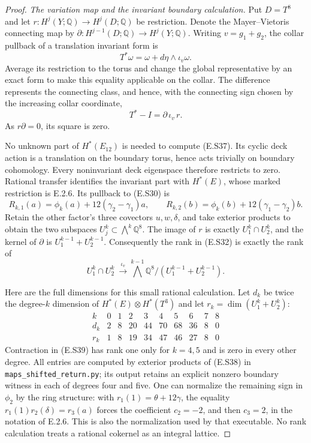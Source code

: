 \begin{proof}
\emph{The variation map and the invariant boundary calculation.}
Put $D=T^8$ and let $r:H^j(Y;\mathbb Q)\to H^j(D;\mathbb Q)$
be restriction. Denote the Mayer--Vietoris connecting map
by $\partial:H^{j-1}(D;\mathbb Q)\to H^j(Y;\mathbb Q)$.
Writing $v=g_1+g_2$, the collar pullback of a translation
invariant form is
\[
       T^*\omega=\omega+d\eta\wedge\iota_v\omega.
\]
Average its restriction to the torus and change the global
representative by an exact form to make this equality
applicable on the collar. The difference represents the
connecting class, and hence, with the connecting sign
chosen by the increasing collar coordinate,
\[
                          T^*-I=\partial\,\iota_v\,r.
 \tag{E.S37}
\]
As $r\partial=0$, its square is zero.

No unknown part of $H^*(E_{12})$ is needed to compute
(E.S37). Its cyclic deck action is a translation on the
boundary torus, hence acts trivially on boundary cohomology.
Every noninvariant deck eigenspace therefore restricts to
zero. Rational transfer identifies the invariant part
with $H^*(E)$, whose marked restriction is E.2.6. Its
pullback to (E.S30) is
\[
 R_{k,1}(a)=\phi_k(a)+12(\gamma_2-\gamma_1)a,
 \qquad
 R_{k,2}(b)=\phi_k(b)+12(\gamma_1-\gamma_2)b.
 \tag{E.S38}
\]
Retain the other factor's three covectors $u,w,\delta$,
and take exterior products to obtain the two subspaces
$U_j^k\subset\bigwedge^k\mathbb Q^8$.
The image of $r$ is exactly $U_1^k\cap U_2^k$, and the
kernel of $\partial$ is $U_1^{k-1}+U_2^{k-1}$.
Consequently the rank in (E.S32) is exactly the rank of
\[
 U_1^k\cap U_2^k\ \stackrel{\iota_v}{\longrightarrow}
 \bigwedge^{k-1}\mathbb Q^8/(U_1^{k-1}+U_2^{k-1}).
 \tag{E.S39}
\]

Here are the full dimensions for this small rational
calculation. Let $d_k$ be twice the degree-$k$ dimension
of $H^*(E)\otimes H^*(T^3)$ and let
$r_k=\dim(U_1^k+U_2^k)$:
\[
 \begin{array}{c|rrrrrrrrr}
 k&0&1&2&3&4&5&6&7&8\\ \hline
 d_k&2&8&20&44&70&68&36&8&0\\
 r_k&1&8&19&34&47&46&27&8&0
 \end{array}
 \tag{E.S40}
\]
Contraction in (E.S39) has rank one only for
$k=4,5$ and is zero in every other degree. All entries
are computed by exterior products of (E.S38) in
\texttt{maps\_shifted\_return.py}; its output retains an
explicit nonzero boundary witness in each of degrees
four and five. One can normalize the remaining sign in
$\phi_2$ by the ring structure: with
$r_1(1)=\theta+12\gamma$, the equality
$r_1(1)r_2(\delta)=r_3(a)$ forces the coefficient
$c_2=-2$, and then $c_3=2$, in the notation of E.2.6.
This is also the normalization used by that executable.
No rank calculation treats a rational cokernel as an
integral lattice.


\end{proof}
